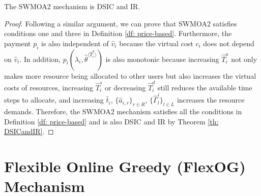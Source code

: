 \documentclass[11pt]{phdthesis}
\begin{document}
\begin{theorem} \label{th: SWMOA2}
    The SWMOA2 mechanism is DSIC and IR.
\end{theorem}

\begin{proof}
    Following a similar argument, we can prove that SWMOA2 satisfies conditions one and three in Definition \ref{df: price-based}. Furthermore, the payment $ p_i$ is also independent of $ \hat{v}_i $ because the virtual cost $ c_i $ does not depend on $ \hat{v}_i $. In addition, $ p_i(\lambda_i, \hat{\theta}^{\langle \hat{T}_i^a \rangle})$ is also monotonic because increasing $\hat{T}_i^a$ not only makes more resource being allocated to other users but also increases the virtual costs of resources, increasing $\hat{T}_i^s$ or decreasing $\hat{T}_i^d$ still reduces the available time steps to allocate, and increasing $ \hat{t}_i $, $ \{ \hat{a}_{i,r} \}_{r \in R} $, $ \{ \hat{\Gamma}_l^i \}_{l \in L} $ increases the resource demands. Therefore, the SWMOA2 mechanism satisfies all the conditions in Definition \ref{df: price-based} and is also DSIC and IR by Theorem \ref{th: DSICandIR}.
    
    
\end{proof}


\section{Flexible Online Greedy (FlexOG) Mechanism} \label{FlexOG}
\end{document}
